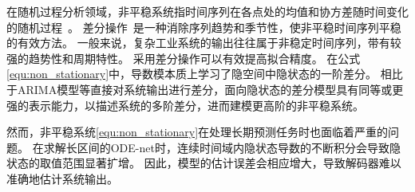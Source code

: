 在随机过程分析领域，非平稳系统指时间序列在各点处的均值和协方差随时间变化的随机过程~\cite{GUIDOLIN2018113}。
差分操作~\cite{christoffersen2001forecasting}是一种消除序列趋势和季节性，使非平稳时间序列平稳的有效方法。
一般来说，复杂工业系统的输出往往属于非稳定时间序列，带有较强的趋势性和周期特性。
采用差分操作可以有效提高拟合精度。
在公式\eqref{equ:non_stationary}中，导数模本质上学习了隐空间中隐状态的一阶差分。
相比于ARIMA模型等直接对系统输出进行差分，面向隐状态的差分模型具有同等或更强的表示能力，以描述系统的多阶差分，进而建模更高阶的非平稳系统。

然而，非平稳系统\eqref{equ:non_stationary}在处理长期预测任务时也面临着严重的问题。
在求解长区间的ODE-net时，连续时间域内隐状态导数的不断积分会导致隐状态的取值范围显著扩增。
因此，模型的估计误差会相应增大，导致解码器难以准确地估计系统输出。

